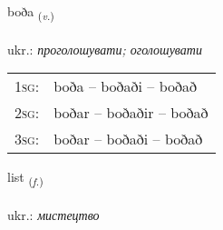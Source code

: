 \documentclass[frontgrid, backgrid]{flacards}\usepackage[]{graphicx}\usepackage[]{xcolor}
\begin{document}
\renewcommand{\flhead}{\vskip5pt \fboxsep=0pt {\small\bfseries\footnotesize Sagnorð | дієслово}}
\renewcommand{\fcfoot}{\vskip5pt \fboxsep=0pt \hspace{2pt}{\small\bfseries\footnotesize 2K}}

\renewcommand{\blhead}{\vskip5pt {\small\bfseries\footnotesize Sagnorð | дієслово }}
\renewcommand{\bcfoot}{\vskip5pt \hspace{2pt}{\small\bfseries\footnotesize 2K}}


{boða \small{\textsubscript{(\textit{v.})}} \\[1ex] %
\textphonetic{[pɔːða]} \\
ukr.: \emph{проголошувати; оголошувати} \\  [2ex]
\renewcommand*{\arraystretch}{0.8}
\begin{tabular}{p{1cm}l}
\textsc{1sg}: & boða -- boðaði -- boðað \\ 
\textsc{2sg}: & boðar -- boðaðir -- boðað \\ 
\textsc{3sg}: & boðar -- boðaði -- boðað \\ 
\end{tabular}
}

\renewcommand{\flhead}{\vskip5pt \fboxsep=0pt {\small\bfseries\footnotesize Nafnorð | іменник}}
\renewcommand{\fcfoot}{\vskip5pt \fboxsep=0pt \hspace{2pt}{\small\bfseries\footnotesize 2K}}

\renewcommand{\blhead}{\vskip5pt {\small\bfseries\footnotesize Nafnorð | іменник }}
\renewcommand{\bcfoot}{\vskip5pt \hspace{2pt}{\small\bfseries\footnotesize 2K}}


{list \small{\textsubscript{(\textit{f.})}} \\[1ex] %
\textphonetic{[lɪst]} \\
ukr.: \emph{мистецтво} \\  [2ex]
\renewcommand*{\arraystretch}{0.8}
}
\end{document}
